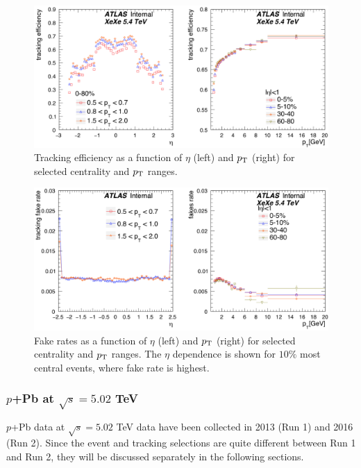 \begin{figure}[H]
\centering
\includegraphics[width=.95\linewidth]{figs/chapter_detector/ATLAS_track_eff_XeXe544.png}
\caption{Tracking efficiency as a function of $\eta$ (left) and $p_\text{T}$ (right) for selected centrality and $p_\text{T}$ ranges.}
\label{fig:detector_ATLAS_track_eff_XeXe544}
\end{figure}

\begin{figure}[H]
\centering
\includegraphics[width=.95\linewidth]{figs/chapter_detector/ATLAS_track_fake_XeXe544.png}
\caption{Fake rates as a function of $\eta$ (left) and $p_\text{T}$ (right) for selected centrality and $p_\text{T}$ ranges. The $\eta$ dependence is shown for $10\%$ most central events, where fake rate is highest.}
\label{fig:detector_ATLAS_track_fake_XeXe544}
\end{figure}



\subsubsection{$p$+Pb at $\sqrt{s}=5.02$ TeV}

$p$+Pb data at $\sqrt{s}=5.02$ TeV data have been collected in 2013 (Run 1) and 2016 (Run 2). Since the event and tracking selections are quite different between Run 1 and Run 2, they will be discussed separately in the following sections.



